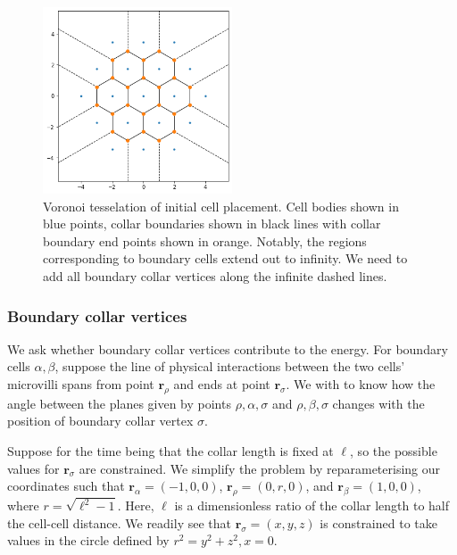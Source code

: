 
\begin{figure}[htbp]
    \centering
    \includegraphics[width=0.5\textwidth]{voronoi.png}
    \caption[Voronoi tesselation of initial cell placement in the $xy$-plane]{Voronoi tesselation of initial cell placement. Cell bodies shown in blue points, collar boundaries shown in black lines with collar boundary end points shown in orange. Notably, the regions corresponding to boundary cells extend out to infinity. We need to add all boundary collar vertices along the infinite dashed lines.}
    \label{fig:voronoi}
\end{figure}

\subsubsection{Boundary collar vertices} \label{subsubsec:bdary_verts}

We ask whether boundary collar vertices contribute to the energy. For boundary cells $\alpha, \beta$, suppose the line of physical interactions between the two cells' microvilli spans from point $\bm{r}_\rho$  and ends at point $\bm{r}_\sigma$. We with to know how the angle between the planes given by points $\rho, \alpha, \sigma$ and $\rho, \beta, \sigma$ changes with the position of boundary collar vertex $\sigma$. 

Suppose for the time being that the collar length is fixed at $\ell$, so the possible values for $\bm{r}_\sigma$ are constrained. We simplify the problem by reparameterising our coordinates such that $\bm{r}_\alpha = (-1, 0, 0)$, $\bm{r}_\rho = (0, r, 0)$, and $\bm{r}_\beta = (1, 0, 0)$, where $r = \sqrt{\ell^2 - 1}$. Here, $\ell$ is a dimensionless ratio of the collar length to half the cell-cell distance. We readily see that $\bm{r}_\sigma = (x, y, z)$ is constrained to take values in the circle defined by $r^2 = y^2 + z^2, x=0$. 

